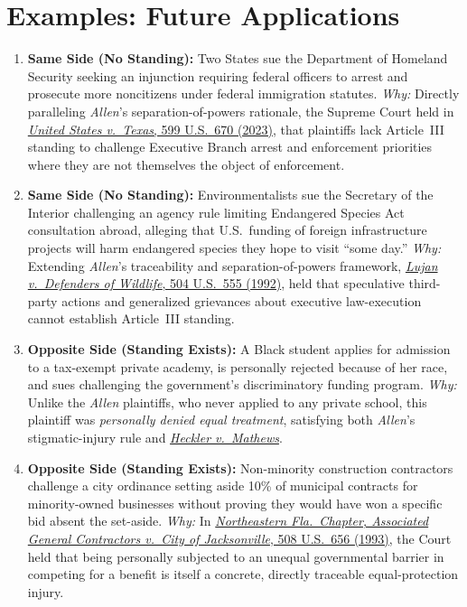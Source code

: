 \documentclass[12pt]{article}
\begin{document}
\section{Examples: Future Applications}
\begin{enumerate}
  \item \textbf{Same Side (No Standing):} Two States sue the Department of Homeland Security seeking an injunction requiring federal officers to arrest and prosecute more noncitizens under federal immigration statutes. \textit{Why:} Directly paralleling \textit{Allen}'s separation-of-powers rationale, the Supreme Court held in \href{https://supreme.justia.com/cases/federal/us/599/22-58/}{\textit{United States v.\ Texas}, 599 U.S.\ 670 (2023)}, that plaintiffs lack Article~III standing to challenge Executive Branch arrest and enforcement priorities where they are not themselves the object of enforcement.
  \item \textbf{Same Side (No Standing):} Environmentalists sue the Secretary of the Interior challenging an agency rule limiting Endangered Species Act consultation abroad, alleging that U.S.\ funding of foreign infrastructure projects will harm endangered species they hope to visit ``some day.'' \textit{Why:} Extending \textit{Allen}'s traceability and separation-of-powers framework, \href{https://supreme.justia.com/cases/federal/us/504/555/}{\textit{Lujan v.\ Defenders of Wildlife}, 504 U.S.\ 555 (1992)}, held that speculative third-party actions and generalized grievances about executive law-execution cannot establish Article~III standing.
  \item \textbf{Opposite Side (Standing Exists):} A Black student applies for admission to a tax-exempt private academy, is personally rejected because of her race, and sues challenging the government's discriminatory funding program. \textit{Why:} Unlike the \textit{Allen} plaintiffs, who never applied to any private school, this plaintiff was \textit{personally denied equal treatment}, satisfying both \textit{Allen}'s stigmatic-injury rule and \href{https://supreme.justia.com/cases/federal/us/465/728/}{\textit{Heckler v.\ Mathews}}.
  \item \textbf{Opposite Side (Standing Exists):} Non-minority construction contractors challenge a city ordinance setting aside 10\% of municipal contracts for minority-owned businesses without proving they would have won a specific bid absent the set-aside. \textit{Why:} In \href{https://supreme.justia.com/cases/federal/us/508/656/}{\textit{Northeastern Fla.\ Chapter, Associated General Contractors v.\ City of Jacksonville}, 508 U.S.\ 656 (1993)}, the Court held that being personally subjected to an unequal governmental barrier in competing for a benefit is itself a concrete, directly traceable equal-protection injury.

\end{enumerate}
\end{document}
